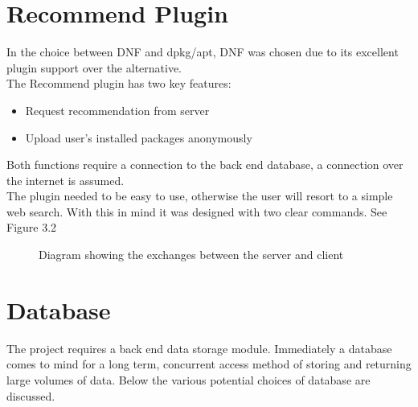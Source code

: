 \documentclass{l4proj}
\begin{document}
\section{Recommend Plugin}
In the choice between DNF and dpkg/apt, DNF was chosen due to its excellent plugin support over the alternative.\\
The Recommend plugin has two key features:
\begin{itemize}
\item Request recommendation from server
\item Upload user's installed packages anonymously
\end{itemize}
Both functions require a connection to the back end database, a connection over the internet is assumed.\\
The plugin needed to be easy to use, otherwise the user will resort to a simple web search. With this in mind it was designed with two clear commands. See Figure 3.2\\
\begin{figure}
\centerline{}
\caption{Diagram showing the exchanges between the server and client}
\end{figure}


\section{Database}
The project requires a back end data storage module. Immediately a database comes to mind for a long term, concurrent access method of storing and returning large volumes of data. Below the various potential choices of database are discussed.
\end{document}
